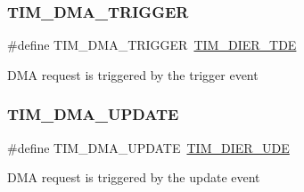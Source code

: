 \subsubsection{\texorpdfstring{T\+I\+M\+\_\+\+D\+M\+A\+\_\+\+T\+R\+I\+G\+G\+ER}{TIM\_DMA\_TRIGGER}}
{\footnotesize\ttfamily \#define T\+I\+M\+\_\+\+D\+M\+A\+\_\+\+T\+R\+I\+G\+G\+ER~\hyperlink{group___peripheral___registers___bits___definition_ga5a752d4295f100708df9b8be5a7f439d}{T\+I\+M\+\_\+\+D\+I\+E\+R\+\_\+\+T\+DE}}

D\+MA request is triggered by the trigger event \mbox{\label{group___t_i_m___d_m_a__sources_ga45816ad15a4f533027eb202ac0b9aaf5}} 
\subsubsection{\texorpdfstring{T\+I\+M\+\_\+\+D\+M\+A\+\_\+\+U\+P\+D\+A\+TE}{TIM\_DMA\_UPDATE}}
{\footnotesize\ttfamily \#define T\+I\+M\+\_\+\+D\+M\+A\+\_\+\+U\+P\+D\+A\+TE~\hyperlink{group___peripheral___registers___bits___definition_gab9f47792b1c2f123464a2955f445c811}{T\+I\+M\+\_\+\+D\+I\+E\+R\+\_\+\+U\+DE}}

D\+MA request is triggered by the update event 